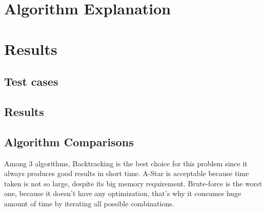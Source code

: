 \documentclass[12pt, a4paper]{article}
\begin{document}
\section{Algorithm Explanation}





\section{Results}
\subsection{Test cases}
\subsection{Results}
\subsection{Algorithm Comparisons}
Among 3 algorithms, Backtracking is the best choice for this problem since it always produces good results in short time. A-Star is 
acceptable because time taken is not so large, despite its big memory requirement. Brute-force is the worst one, 
because it doesn't have any optimization, that's why it consumes huge amount of time by iterating all possible combinations.
\end{document}
